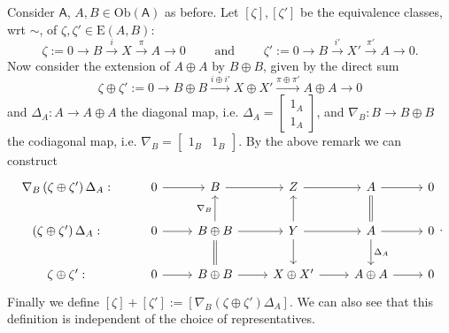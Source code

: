 \begin{defn}
	Consider $\mathsf{A}$, $A,B \in \mathrm{Ob} \left(\mathsf{A}\right)$ as before.
	Let $\left[ \zeta \right], \left[ \zeta' \right]$ be the equivalence classes, wrt $\sim$,
	of $\zeta,\zeta' \in \mathrm{E}(A,B)$:
	\begin{equation}
	\zeta := 0 \to B \xrightarrow{i} X \xrightarrow{\pi} A \to 0
	\qquad \text{ and } \qquad
	\zeta' := 0 \to B \xrightarrow{i'} X' \xrightarrow{\pi'} A \to 0
	.\end{equation} 
	Now consider the extension of $A \oplus A$ by $B \oplus B$, given by the direct sum
	\begin{equation}
	\zeta \oplus \zeta' :=
	0 \to B \oplus B \xrightarrow{i \oplus i'} X \oplus X' \xrightarrow{\pi \oplus \pi'} 
	A \oplus A \to 0
	\end{equation} 
	and $\Delta_A: A \to A \oplus A$ the diagonal map, i.e. $\Delta_A = \begin{bmatrix} 1_A \\ 1_A \end{bmatrix}$,
	and $\nabla_B: B \to B \oplus B$ the codiagonal map, i.e. $\nabla_B = \begin{bmatrix} 1_B & 1_B \end{bmatrix}$.
	By the above remark we can construct
	\begin{equation}
	\begin{tikzcd}
		\nabla_B \left( \zeta \oplus \zeta' \right) \Delta_A: &
		0 \arrow[r, "", rightarrow] &
		B \arrow[r, "", rightarrow] &
		Z \arrow[r, "", rightarrow] &
		A \arrow[r, "", rightarrow] \arrow[d, "", equal] &
		0\\
		\left( \zeta \oplus \zeta' \right) \Delta_A : &
		0 \arrow[r, "", rightarrow] &
		B \oplus B \arrow[r, "", rightarrow] \arrow[d, "", equal] \arrow[u, "\nabla_B", rightarrow] &
		Y \arrow[r, "", rightarrow] \arrow[d, "", rightarrow] \arrow[u, "", rightarrow] &
		A \arrow[r, "", rightarrow] \arrow[d, "\Delta_A", rightarrow] &
		0\\
		\zeta \oplus \zeta' : &
		0 \arrow[r, "", rightarrow] &
		B \oplus B \arrow[r, "", rightarrow] &
		X \oplus X' \arrow[r, "", rightarrow] &
		A \oplus A \arrow[r, "", rightarrow] &
		0
	\end{tikzcd}
	.\end{equation} 
	Finally we define $\left[ \zeta \right] + \left[ \zeta' \right] :=
	\left[ \nabla_B \left( \zeta \oplus \zeta' \right)\Delta_A \right]$.
	We can also see that this definition is independent of the choice
	of representatives.
\end{defn}

